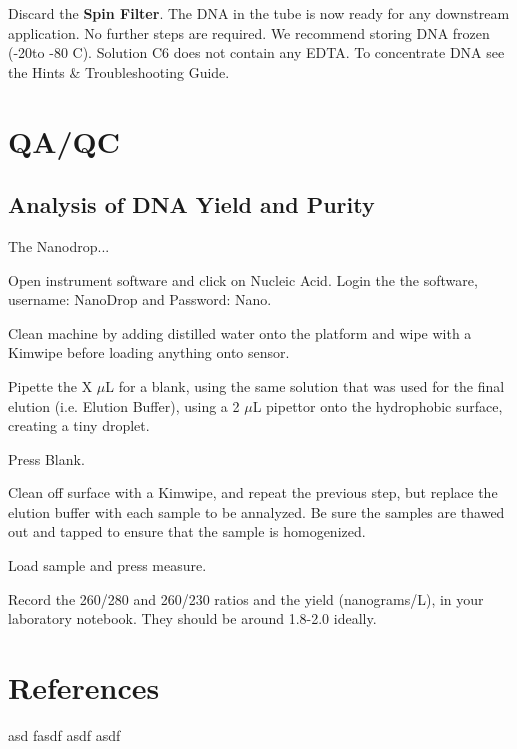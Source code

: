 \documentclass[12pt]{../SOP3_alpha}
\begin{document}
\NP Discard the \textbf{Spin Filter}. The DNA in the tube is now ready for any downstream application. No further steps are required. We recommend storing DNA frozen (-20\degree to -80 \degree C). Solution C6 does not contain any EDTA. To concentrate DNA see the Hints \& Troubleshooting Guide.

\section{QA/QC}

\subsection*{Analysis of DNA Yield and Purity}

\NP The Nanodrop...

\NP Open instrument software and click on Nucleic Acid. Login the the software, username: NanoDrop and Password: Nano.

\NP Clean machine by adding distilled water onto the platform and wipe with a Kimwipe before loading anything onto sensor. 

\NP Pipette the X $\mu$L for a blank, using the same solution that was used for the final elution (i.e. Elution Buffer), using a 2 $\mu$L pipettor onto the hydrophobic surface, creating a tiny droplet.

\NP Press Blank.

\NP Clean off surface with a Kimwipe, and repeat the previous step, but replace the elution buffer with each sample to be annalyzed. Be sure the samples are thawed out and tapped to ensure that the sample is homogenized.

\NP Load sample and press measure.

\NP Record the 260/280 and 260/230 ratios and the yield (nanograms/L), in your laboratory notebook. They should be around 1.8-2.0 ideally. 


\section{References}

\NP asd fasdf asdf asdf 
\end{document}

